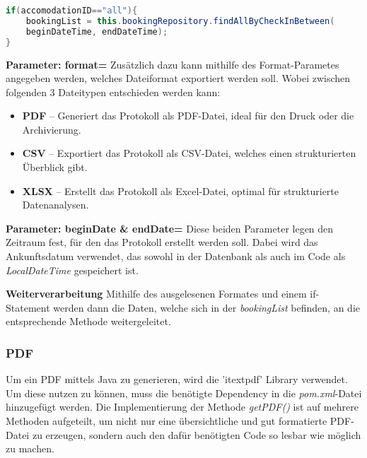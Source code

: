 \begin{lstlisting}[language=Java, caption={Code-Ausschnitt: Buchungen Laden.}]
if(accomodationID=="all"){
	bookingList = this.bookingRepository.findAllByCheckInBetween(
	beginDateTime, endDateTime);
}
\end{lstlisting}

	\vspace{3mm}
	\noindent \textbf{Parameter: format=}\vspace{3mm}\newline
	Zusätzlich dazu kann mithilfe des Format-Parametes angegeben werden, welches Dateiformat exportiert werden soll. Wobei zwischen folgenden 3 Dateitypen entschieden werden kann:
	
	\vspace{3mm}
	\begin{itemize}
		\item \textbf{PDF} – Generiert das Protokoll als PDF-Datei, ideal für den Druck oder die Archivierung.  
		\item \textbf{CSV} – Exportiert das Protokoll als CSV-Datei, welches einen strukturierten Überblick gibt.
		\item \textbf{XLSX} – Erstellt das Protokoll als Excel-Datei, optimal für strukturierte Datenanalysen.  
	\end{itemize}
	
	
	\vspace{3mm}
	\noindent \textbf{Parameter: beginDate \& endDate=}\vspace{3mm}\newline
	Diese beiden Parameter legen den Zeitraum fest, für den das Protokoll erstellt werden soll. Dabei wird das Ankunftsdatum verwendet, das sowohl in der Datenbank als auch im Code als \textit{LocalDateTime} gespeichert ist.
	
	\vspace{3mm}
	\noindent \textbf{Weiterverarbeitung}\vspace{3mm}\newline
	Mithilfe des ausgelesenen Formates und einem if-Statement werden dann die Daten, welche sich in der \textit{bookingList} befinden, an die entsprechende Methode weitergeleitet.
	\newpage
	\subsubsection{PDF}
	Um ein PDF mittels Java zu generieren, wird die 'itextpdf' Library verwendet. Um diese nutzen zu können, muss die benötigte Dependency in die \textit{pom.xml}-Datei hinzugefügt werden. Die Implementierung der Methode \textit{getPDF()} ist auf mehrere Methoden aufgeteilt, um nicht nur eine übersichtliche und gut formatierte PDF-Datei zu erzeugen, sondern auch den dafür benötigten Code so lesbar wie möglich zu machen.
	
